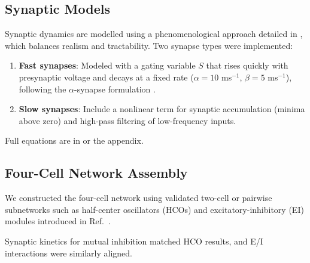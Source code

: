 \documentclass[nofootinbib,aip,amsmath,amssymb,reprint,twocolumn,10pt]{revtex4-2}
\begin{document}
\subsection*{Synaptic Models}
Synaptic dynamics are modelled using a phenomenological approach detailed in \cite{scully2024pairing}, which balances realism and tractability.
Two synapse types were implemented:
\begin{enumerate}
    \item \textbf{Fast synapses}: Modeled with a gating variable $S$ that rises quickly with presynaptic voltage and decays at a fixed rate ($\alpha = 10$ ms$^{-1}$, $\beta = 5$ ms$^{-1}$), following the $\alpha$-synapse formulation \cite{destexhe1994synthesis}.
    \item \textbf{Slow synapses}: Include a nonlinear term for synaptic accumulation (minima above zero) and high-pass filtering of low-frequency inputs.
\end{enumerate}
Full equations are in \cite{scully2024pairing} or the appendix.

\subsection*{Four-Cell Network Assembly}
We constructed the four-cell network using validated two-cell or pairwise subnetworks 
such as half-center oscillators 
(HCOs) and  excitatory-inhibitory (EI) modules introduced in Ref.~\cite{scully2024pairing}.
 
 
Synaptic kinetics for mutual inhibition matched HCO results, and E/I interactions were similarly aligned.
\end{document}
